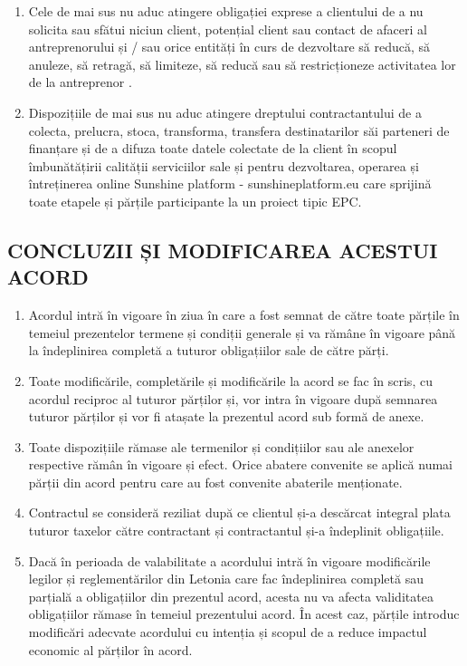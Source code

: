 \begin{multicols}{2}
\begin{enumerate}
\item Cele de mai sus nu aduc atingere obligației exprese a clientului de a nu solicita sau sfătui niciun client, potențial client sau contact de afaceri al antreprenorului și / sau orice entități în curs de dezvoltare să reducă, să anuleze, să retragă, să limiteze, să reducă sau să restricționeze activitatea lor de la antreprenor .
\item Dispozițiile de mai sus nu aduc atingere dreptului contractantului de a colecta, prelucra, stoca, transforma, transfera destinatarilor săi parteneri de finanțare și de a difuza toate datele colectate de la client în scopul îmbunătățirii calității serviciilor sale și pentru dezvoltarea, operarea și întreținerea online Sunshine platform - sunshineplatform.eu care sprijină toate etapele și părțile participante la un proiect tipic EPC.
\end{enumerate}

\subsection{CONCLUZII ȘI MODIFICAREA ACESTUI ACORD}
\begin{enumerate}
\item Acordul intră în vigoare în ziua în care a fost semnat de către toate părțile în temeiul prezentelor termene și condiții generale și va rămâne în vigoare până la îndeplinirea completă a tuturor obligațiilor sale de către părți.
\item Toate modificările, completările și modificările la acord se fac în scris, cu acordul reciproc al tuturor părților și, vor intra în vigoare după semnarea tuturor părților și vor fi atașate la prezentul acord sub formă de anexe.
\item Toate dispozițiile rămase ale termenilor și condițiilor sau ale anexelor respective rămân în vigoare și efect. Orice abatere convenite se aplică numai părții din acord pentru care au fost convenite abaterile menționate.
\item Contractul se consideră reziliat după ce clientul și-a descărcat integral plata tuturor taxelor către contractant și contractantul și-a îndeplinit obligațiile.
\item Dacă în perioada de valabilitate a acordului intră în vigoare modificările legilor și reglementărilor din Letonia care fac îndeplinirea completă sau parțială a obligațiilor din prezentul acord, acesta nu va afecta validitatea obligațiilor rămase în temeiul prezentului acord. În acest caz, părțile introduc modificări adecvate acordului cu intenția și scopul de a reduce impactul economic al părților în acord.
\end{enumerate}


\end{multicols}
